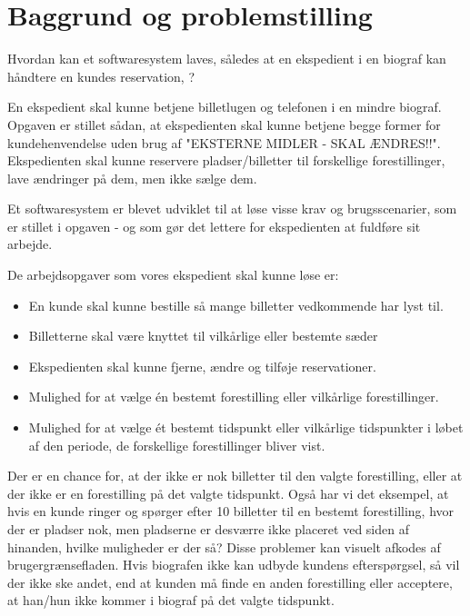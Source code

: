 \chapter{Baggrund og problemstilling}

Hvordan kan et softwaresystem laves, således at en ekspedient i en biograf kan håndtere en kundes reservation,  ?


En ekspedient skal kunne betjene billetlugen og telefonen i en mindre biograf. Opgaven er stillet sådan, at ekspedienten skal kunne betjene begge former for kundehenvendelse uden brug af "EKSTERNE MIDLER - SKAL ÆNDRES!!". Ekspedienten skal kunne reservere pladser/billetter til forskellige forestillinger, lave ændringer på dem, men ikke sælge dem.

Et softwaresystem er blevet udviklet til at løse visse krav og brugsscenarier, som er stillet i opgaven - og som gør det lettere for ekspedienten at fuldføre sit arbejde.

De arbejdsopgaver som vores ekspedient skal kunne løse er:
\begin{itemize}
  \item En kunde skal kunne bestille så mange billetter vedkommende har lyst til.
  \item Billetterne skal være knyttet til vilkårlige eller bestemte sæder
  \item Ekspedienten skal kunne fjerne, ændre og tilføje reservationer.
  \item Mulighed for at vælge én bestemt forestilling eller vilkårlige forestillinger.
  \item Mulighed for at vælge ét bestemt tidspunkt eller vilkårlige tidspunkter i løbet af den periode, de forskellige forestillinger bliver vist.
\end{itemize}

Der er en chance for, at der ikke er nok billetter til den valgte forestilling, eller at der ikke er en forestilling på det valgte tidspunkt. Også har vi det eksempel, at hvis en kunde ringer og spørger efter 10 billetter til en bestemt forestilling, hvor der er pladser nok, men pladserne er desværre ikke placeret ved siden af hinanden, hvilke muligheder er der så? Disse problemer kan visuelt afkodes af brugergrænsefladen. Hvis biografen ikke kan udbyde kundens efterspørgsel, så vil der ikke ske andet, end at kunden må finde en anden forestilling eller acceptere, at han/hun ikke kommer i biograf på det valgte tidspunkt.


